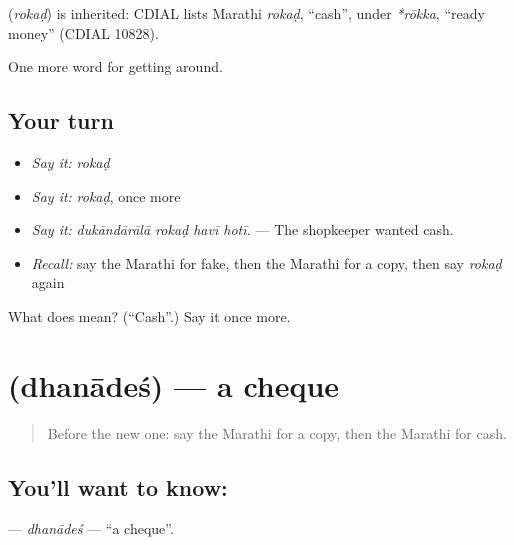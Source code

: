 \begin{cousinweb}
\textbf{} (\emph{rokaḍ}) is inherited: CDIAL lists Marathi \emph{rokaḍ}, \textquotedblleft{}cash\textquotedblright{}, under \emph{*rōkka}, \textquotedblleft{}ready money\textquotedblright{} (CDIAL 10828).
\end{cousinweb}

\begin{grammarlens}[title={What you've built}]
One more word for getting around.
\end{grammarlens}

\subsection*{Your turn}
\begin{itemize}
\raggedright
  \item \emph{Say it:} \emph{rokaḍ}
  \item \emph{Say it:} \emph{rokaḍ}, once more
  \item \emph{Say it:} \emph{dukāndārālā rokaḍ havī hotī.} — The shopkeeper wanted cash.
  \item \emph{Recall:} say the Marathi for fake, then the Marathi for a copy, then say \emph{rokaḍ} again
\end{itemize}

\begin{tcolorbox}[breakable,colback=teal!4,colframe=teal!35!black,title={Before you move on}]
What does  mean? (\textquotedblleft{}Cash\textquotedblright{}.) Say it once more.
\end{tcolorbox}
\section[\texorpdfstring{\mr{धनादेश} (dhanādeś)}{धनादेश (dhanādeś)}]{ (dhanādeś) — a cheque}

\label{lesson:MR-C426-dhanades}



\begin{quote}
Before the new one: say the Marathi for a copy, then the Marathi for cash.
\end{quote}

\subsection*{You'll want to know: }
\textbf{} — \emph{dhanādeś} — \textquotedblleft{}a cheque\textquotedblright{}.

